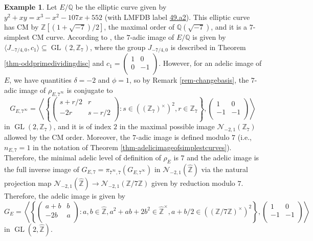 \documentclass[11pt]{amsart}
\theoremstyle{definition}
\newtheorem{example}[defn]{Example}
\newcommand{\Q}{\mathbb{Q}}
\newcommand{\Z}{\mathbb{Z}}
\newcommand{\GL}{\operatorname{GL}}
\begin{document}
\begin{example}\label{ex-intro1-details}
    Let $E/\Q$ be the elliptic curve given by $y^2+xy=x^3-x^2-107x+552$ (with LMFDB label \href{https://www.lmfdb.org/EllipticCurve/Q/49/a/2}{49.a2}). This elliptic curve has CM by $\Z[(1+\sqrt{-7})/2]$, the maximal order of $\Q(\sqrt{-7})$, and it is a $7$-simplest CM curve.  According to \cite[Table 4]{modelspaper}, the $7$-adic image of $E/\Q$ is given by $\langle J_{-7/4, 0},c_1 \rangle \subseteq \GL(2,\Z_7)$, where the group $J_{-7/4,0}$ is described in Theorem \ref{thm-oddprimedividingdisc} and $c_1= \left(\begin{array}{cc} 1 & 0\\  0 & -1 \\ \end{array}\right)$. However, for an adelic image of $E$, we have quantities $\delta=-2$ and $\phi=1$, so by Remark \ref{rem-changebasis}, the $7$-adic image of $\rho_{E,7^\infty}$ is conjugate to
$$G_{E,7^\infty}=\left\langle \left\{ \left(\begin{array}{cc} s+r/2 & r\\ -2r & s-r/2 \\\end{array}\right) : s \in ((\Z_7)^\times)^2, r\in \Z_7 \right\}, \left(\begin{array}{cc} 1 & 0\\ -1 & -1 \\\end{array}\right)\right\rangle$$
in $\GL(2,\Z_7)$, and it is of index $2$
 in the maximal possible image $\mathcal{N}_{-2,1}(\Z_7)$ allowed by the CM order. Moreover, the $7$-adic image is defined modulo $7$ (i.e., $n_{E,7}=1$ in the notation of Theorem \ref{thm-adelicimageofsimplestcurves}). Therefore, the minimal adelic level of definition of $\rho_E$ is $7$ and the adelic image is the full inverse image of $G_{E,7}=\pi_{7^\infty,7}(G_{E,7^\infty})$ in $\mathcal{N}_{-2,1}(\widehat{\Z})$ via the natural projection map  $\mathcal{N}_{-2,1}(\widehat{\Z})\to \mathcal{N}_{-2,1}(\Z/7\Z)$ given by reduction modulo $7$. Therefore, the adelic image is given by
 $$G_{E}=\left\langle \left\{ \left(\begin{array}{cc} a+b & b\\ -2b & a \\\end{array}\right) : a,b \in \widehat{\Z}, a^2+ab+2b^2 \in \widehat{\Z}^\times, a+b/2 \in ((\Z/7\Z)^\times)^2\right\}, \left(\begin{array}{cc} 1 & 0\\ -1 & -1 \\\end{array}\right)\right\rangle$$
 in $\GL(2,\widehat{\Z})$.
 \end{example}
\end{document}
